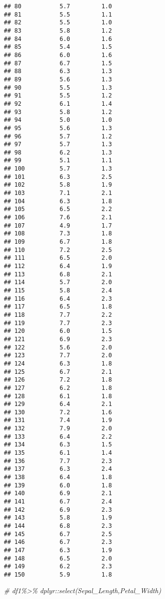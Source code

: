 \documentclass[
]{article}
\newenvironment{Shaded}{\begin{snugshade}}{\end{snugshade}}
\newcommand{\CommentTok}[1]{\textcolor[rgb]{0.56,0.35,0.01}{\textit{#1}}}
\begin{document}
\begin{verbatim}
## 80           5.7         1.0
## 81           5.5         1.1
## 82           5.5         1.0
## 83           5.8         1.2
## 84           6.0         1.6
## 85           5.4         1.5
## 86           6.0         1.6
## 87           6.7         1.5
## 88           6.3         1.3
## 89           5.6         1.3
## 90           5.5         1.3
## 91           5.5         1.2
## 92           6.1         1.4
## 93           5.8         1.2
## 94           5.0         1.0
## 95           5.6         1.3
## 96           5.7         1.2
## 97           5.7         1.3
## 98           6.2         1.3
## 99           5.1         1.1
## 100          5.7         1.3
## 101          6.3         2.5
## 102          5.8         1.9
## 103          7.1         2.1
## 104          6.3         1.8
## 105          6.5         2.2
## 106          7.6         2.1
## 107          4.9         1.7
## 108          7.3         1.8
## 109          6.7         1.8
## 110          7.2         2.5
## 111          6.5         2.0
## 112          6.4         1.9
## 113          6.8         2.1
## 114          5.7         2.0
## 115          5.8         2.4
## 116          6.4         2.3
## 117          6.5         1.8
## 118          7.7         2.2
## 119          7.7         2.3
## 120          6.0         1.5
## 121          6.9         2.3
## 122          5.6         2.0
## 123          7.7         2.0
## 124          6.3         1.8
## 125          6.7         2.1
## 126          7.2         1.8
## 127          6.2         1.8
## 128          6.1         1.8
## 129          6.4         2.1
## 130          7.2         1.6
## 131          7.4         1.9
## 132          7.9         2.0
## 133          6.4         2.2
## 134          6.3         1.5
## 135          6.1         1.4
## 136          7.7         2.3
## 137          6.3         2.4
## 138          6.4         1.8
## 139          6.0         1.8
## 140          6.9         2.1
## 141          6.7         2.4
## 142          6.9         2.3
## 143          5.8         1.9
## 144          6.8         2.3
## 145          6.7         2.5
## 146          6.7         2.3
## 147          6.3         1.9
## 148          6.5         2.0
## 149          6.2         2.3
## 150          5.9         1.8
\end{verbatim}

\begin{Shaded}
\begin{Highlighting}[]
\CommentTok{\# df1\%\textgreater{}\% dplyr::select(Sepal\_Length,Petal\_Width)}
\end{Highlighting}
\end{Shaded}
\end{document}

